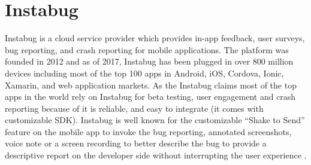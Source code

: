 \section{Instabug}

Instabug is a cloud service provider which provides in-app feedback, user
surveys, bug reporting, and crash reporting for mobile applications. The
platform was founded in 2012 and as of 2017, Instabug has been plugged in over
800 million devices including most of the top 100 apps in Android, iOS, Cordova,
Ionic, Xamarin, and web application markets\cite{hid-sp18-409-www-instabug}. As
the Instabug \cite{hid-sp18-409-www-instabug} claims  most of the top apps in
the world rely on Instabug for beta testing, user engagement and crash reporting
because of it is reliable, and easy to integrate (it comes with customizable
SDK). Instabug is well known for the customizable “Shake to Send” feature on the
mobile app to invoke the bug reporting, annotated screenshots, voice note or a
screen recording to better describe the bug to provide a descriptive report on
the developer side without interrupting the user experience
\cite{hid-sp18-409-www-instabug-wikipedia}.

